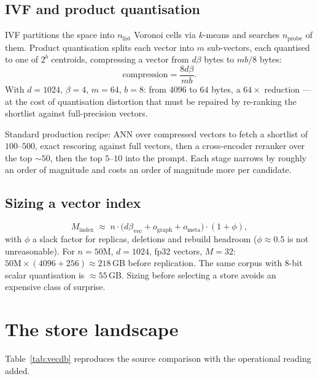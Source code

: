 \documentclass[11pt,twoside,openright]{book}
\theoremstyle{definition}
\theoremstyle{plain}
\theoremstyle{remark}
\begin{document}
\subsection{IVF and product quantisation}

IVF partitions the space into $n_{\text{list}}$ Voronoi cells via $k$-means and
searches $n_{\text{probe}}$ of them. Product quantisation splits each vector into
$m$ sub-vectors, each quantised to one of $2^{b}$ centroids, compressing a
vector from $d\beta$ bytes to $mb/8$ bytes:
\begin{equation}
  \text{compression} = \frac{8 d \beta}{m b}.
\end{equation}
With $d=1024$, $\beta=4$, $m=64$, $b=8$: from $4096$ to $64$ bytes, a $64\times$
reduction --- at the cost of quantisation distortion that must be repaired by
re-ranking the shortlist against full-precision vectors.

\begin{practice}
Standard production recipe: ANN over compressed vectors to fetch a shortlist of
$100$--$500$, exact rescoring against full vectors, then a cross-encoder
reranker over the top $\sim\!50$, then the top $5$--$10$ into the prompt. Each
stage narrows by roughly an order of magnitude and costs an order of magnitude
more per candidate.
\end{practice}

\subsection{Sizing a vector index}

\begin{equation}
  M_{\text{index}} \;\approx\; n \cdot \bigl(d\beta_{\text{vec}} + o_{\text{graph}} + o_{\text{meta}}\bigr) \cdot (1+\phi),
\label{eq:index-size}
\end{equation}
with $\phi$ a slack factor for replicas, deletions and rebuild headroom
($\phi \approx 0.5$ is not unreasonable). For $n=50$M, $d=1024$, fp32 vectors,
$M=32$: $50\text{M}\times(4096+256) \approx 218$\,GB before replication. The
same corpus with $8$-bit scalar quantisation is $\approx 55$\,GB. Sizing before
selecting a store avoids an expensive class of surprise.

\section{The store landscape}

Table~\ref{tab:vecdb} reproduces the source comparison with the operational
reading added.
\end{document}
